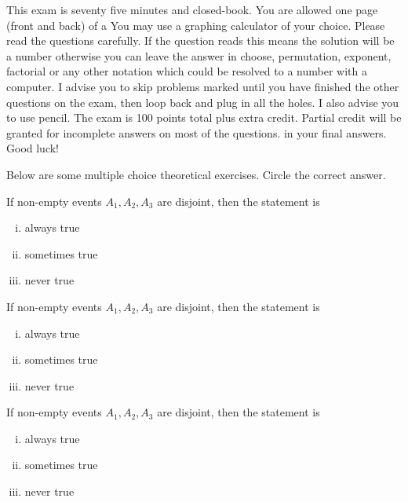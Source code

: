 \documentclass[12pt]{article}
\begin{document}
This exam is seventy five minutes and closed-book. You are allowed one page (front and back) of a  You may use a graphing calculator of your choice. Please read the questions carefully. If the question reads  this means the solution will be a number otherwise you can leave the answer in choose, permutation, exponent, factorial or any other notation which could be resolved to a number with a computer. I advise you to skip problems marked  until you have finished the other questions on the exam, then loop back and plug in all the holes. I also advise you to use pencil. The exam is 100 points total plus extra credit. Partial credit will be granted for incomplete answers on most of the questions.  in your final answers. Good luck!

\pagebreak

\problem Below are some multiple choice theoretical exercises. Circle the correct answer.


\benum
{} If non-empty events $A_1, A_2, A_3$ are disjoint, then the statement  is

\begin{enumerate}[(i)]
\item always true
\item sometimes true
\item never true
\end{enumerate}

 If non-empty events $A_1, A_2, A_3$ are disjoint, then the statement  is

\begin{enumerate}[(i)]
\item always true
\item sometimes true
\item never true
\end{enumerate}

 If non-empty events $A_1, A_2, A_3$ are disjoint, then the statement  is

\begin{enumerate}[(i)]
\item always true
\item sometimes true
\item never true
\end{enumerate}
\end{document}
